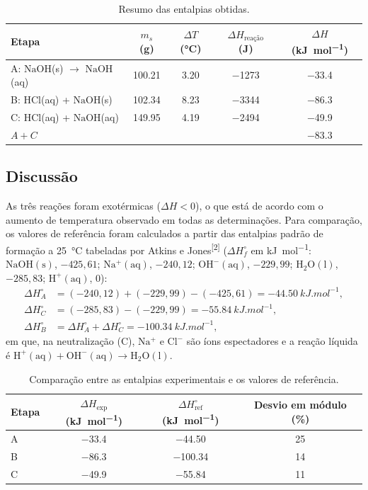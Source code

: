 \begin{table}[H]
\centering
\caption{Resumo das entalpias obtidas.}
\label{tab:resumo}
\begin{tabular}{lcccc}
\toprule
\textbf{Etapa} & $m_s$ (g) & $\Delta T$ (\si{\degreeCelsius}) & $\Delta H_{\text{reação}}$ (J) & $\Delta H$ (\si{kJ.mol^{-1}})\\
\midrule
A: $\mathrm{NaOH}$(s) $\rightarrow$ $\mathrm{NaOH}$(aq) & \num{100,21} & \num{3,20} & \num{-1273} & \num{-33,4}\\
B: $\mathrm{HCl}$(aq) + $\mathrm{NaOH}$(s) & \num{102,34} & \num{8,23} & \num{-3344} & \num{-86,3}\\
C: $\mathrm{HCl}$(aq) + $\mathrm{NaOH}$(aq) & \num{149,95} & \num{4,19} & \num{-2494} & \num{-49,9}\\
\midrule
$A + C$ & & & & \num{-83,3}\\
\bottomrule
\end{tabular}
\end{table}

\subsection{Discussão}

As três reações foram exotérmicas ($\Delta H < 0$), o que está de acordo com o aumento de temperatura observado em todas as determinações. Para comparação, os valores de referência foram calculados a partir das entalpias padrão de formação a \SI{25}{\degreeCelsius} tabeladas por Atkins e Jones\textsuperscript{[2]} ($\Delta H_f^{\circ}$ em \si{kJ.mol^{-1}}: $\mathrm{NaOH(s)}$, $-425{,}61$; $\mathrm{Na^{+}(aq)}$, $-240{,}12$; $\mathrm{OH^{-}(aq)}$, $-229{,}99$; $\mathrm{H_2O(l)}$, $-285{,}83$; $\mathrm{H^{+}(aq)}$, 0):
\[
\begin{aligned}
\Delta H_A^{\circ} &= (-240{,}12) + (-229{,}99) - (-425{,}61) = \SI{-44,50}{kJ.mol^{-1}},\\
\Delta H_C^{\circ} &= (-285{,}83) - (-229{,}99) = \SI{-55,84}{kJ.mol^{-1}},\\
\Delta H_B^{\circ} &= \Delta H_A^{\circ} + \Delta H_C^{\circ} = \SI{-100,34}{kJ.mol^{-1}},
\end{aligned}
\]
em que, na neutralização (C), $\mathrm{Na^{+}}$ e $\mathrm{Cl^{-}}$ são íons espectadores e a reação líquida é $\mathrm{H^{+}(aq)} + \mathrm{OH^{-}(aq)} \rightarrow \mathrm{H_2O(l)}$.

\begin{table}[H]
\centering
\caption{Comparação entre as entalpias experimentais e os valores de referência.}
\label{tab:literatura}
\begin{tabular}{lccc}
\toprule
\textbf{Etapa} & $\Delta H_{\text{exp}}$ (\si{kJ.mol^{-1}}) & $\Delta H^{\circ}_{\text{ref}}$ (\si{kJ.mol^{-1}}) & Desvio em módulo (\%)\\
\midrule
A & \num{-33,4} & \num{-44,50} & \num{25}\\
B & \num{-86,3} & \num{-100,34} & \num{14}\\
C & \num{-49,9} & \num{-55,84} & \num{11}\\
\bottomrule
\end{tabular}
\end{table}

